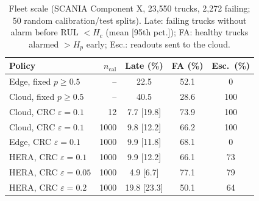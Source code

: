 \begin{table}[t]
\centering
\caption{Fleet scale (SCANIA Component X, 23{,}550 trucks, 2{,}272 failing; 50 random calibration/test splits). Late: failing trucks without alarm before RUL $<H_c$ (mean [95th pct.]); FA: healthy trucks alarmed $>H_p$ early; Esc.: readouts sent to the cloud.}
\label{tab:fleet}
\footnotesize\setlength{\tabcolsep}{2.2pt}
\begin{tabular}{lrccc}
\toprule
Policy & $n_{\mathrm{cal}}$ & Late (\%) & FA (\%) & Esc.\ (\%) \\
\midrule
Edge, fixed $p{\ge}0.5$ & -- & 22.5 & 52.1 & 0 \\
Cloud, fixed $p{\ge}0.5$ & -- & 40.5 & 28.6 & 100 \\
\midrule
Cloud, CRC $\varepsilon{=}0.1$ & 12 & 7.7 [19.8] & 73.9 & 100 \\
\midrule
Cloud, CRC $\varepsilon{=}0.1$ & 1000 & 9.8 [12.2] & 66.2 & 100 \\
Edge, CRC $\varepsilon{=}0.1$ & 1000 & 9.9 [11.8] & 68.1 & 0 \\
HERA, CRC $\varepsilon{=}0.1$ & 1000 & 9.9 [12.2] & 66.1 & 73 \\
HERA, CRC $\varepsilon{=}0.05$ & 1000 & 4.9 [6.7] & 77.1 & 79 \\
HERA, CRC $\varepsilon{=}0.2$ & 1000 & 19.8 [23.3] & 50.1 & 64 \\
\bottomrule
\end{tabular}
\end{table}
